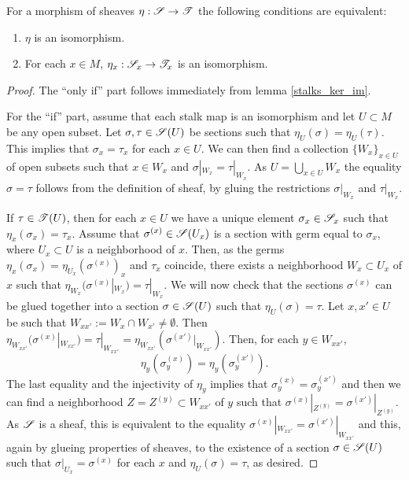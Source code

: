 \begin{theorem}\label{stalk_iso}
For a morphism of sheaves $\eta :\mathscr{S}\to \mathscr{T}$ the following conditions are equivalent:
\begin{enumerate}
\item $\eta$ is an isomorphism.
\item For each $x\in M$, $\eta_x:\mathscr{S}_x\to \mathscr{T}_x$ is an isomorphism.
\end{enumerate}
\end{theorem}
\begin{proof}
The ``only if'' part follows immediately from lemma \ref{stalks_ker_im}.

For the ``if'' part, assume that each stalk map is an isomorphism and let $U\subset M$ be any open subset. Let $\sigma,\tau \in \mathscr{S}(U)$ be sections such that $\eta_U(\sigma )=\eta_U(\tau )$. This implies that $\sigma_x=\tau_x$ for each $x\in U$. We can then find a collection $\{W_x\}_{x\in U}$ of open subsets such that $x\in W_x$ and $\sigma|_{W_x}=\tau|_{W_x}$. As $U=\bigcup_{x\in U}W_x$ the equality $\sigma=\tau$ follows from the definition of sheaf, by gluing the restrictions $\sigma|_{W_x}$ and $\tau|_{W_x}$.

If $\tau \in \mathscr{T}(U)$, then for each $x\in U$ we have a unique element $\sigma_x\in \mathscr{S}_x$ such that $\eta_x(\sigma_x)=\tau_x$. Assume that $\sigma^{(x)}\in \mathscr{S}(U_x)$ is a section with germ equal to $\sigma_x$, where $U_x\subset U$ is a neighborhood of $x$. Then, as the germs $\eta_x(\sigma_x)=\eta_{U_x}(\sigma^{(x)})_x$ and $\tau_x$ coincide, there exists a neighborhood $W_x\subset U_x$ of $x$ such that $\eta_{W_x}(\sigma^{(x)}|_{W_x})=\tau|_{W_x}$. We will now check that the sections $\sigma^{(x)}$ can be glued together into a section $\sigma \in \mathscr{S}(U)$ such that $\eta_U(\sigma )=\tau$. Let $x,x'\in U$ be such that $W_{xx'}:=W_x\cap W_{x'}\neq \emptyset$. Then $\eta_{W_{xx'}}(\sigma^{(x)}|_{W_{xx'}})=\tau|_{W_{xx'}}=\eta_{W_{xx'}}(\sigma^{(x')}|_{W_{xx'}})$. Then, for each $y\in W_{xx'}$,
$$\eta_y(\sigma^{(x)}_y)=\eta_y(\sigma^{(x')}_y).$$
The last equality and the injectivity of $\eta_y$ implies that $\sigma^{(x)}_y=\sigma^{(x')}_y$ and then we can find a neighborhood $Z=Z^{(y)}\subset W_{xx'}$ of $y$ such that $\sigma^{(x)}|_{Z^{(y)}}=\sigma^{(x')}|_{Z^{(y)}}$. As $\mathscr{S}$ is a sheaf, this is equivalent to the equality $\sigma^{(x)}|_{W_{xx'}}=\sigma^{(x')}|_{W_{xx'}}$ and this, again by glueing properties of sheaves, to the existence of a section $\sigma \in \mathscr{S}(U)$ such that $\sigma|_{U_x}=\sigma^{(x)}$ for each $x$ and $\eta_U(\sigma )=\tau$, as desired.
\end{proof}


